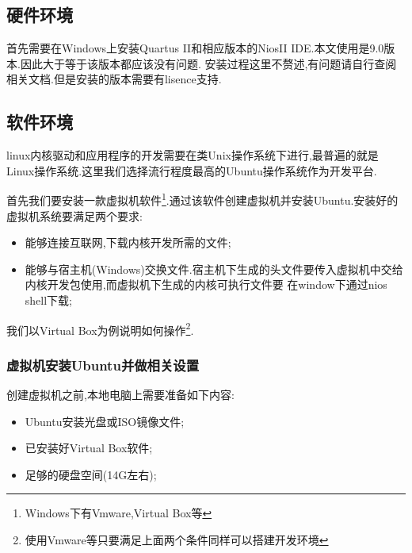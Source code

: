 \documentclass[12pt,a4paper,titlepage]{article}
\begin{document}
\subsection{硬件环境}
首先需要在Windows上安装Quartus II和相应版本的NiosII IDE.本文使用是9.0版本.因此大于等于该版本都应该没有问题.
安装过程这里不赘述,有问题请自行查阅相关文档.但是安装的版本{需要有lisence支持}.
\subsection{软件环境}
linux内核驱动和应用程序的开发需要在类Unix操作系统下进行,最普遍的就是Linux操作系统.这里我们选择流行程度最高的Ubuntu操作系统作为开发平台.

首先我们要安装一款虚拟机软件\footnote{Windows下有Vmware,Virtual Box等}.通过该软件创建虚拟机并安装Ubuntu.安装好的虚拟机系统要满足两个要求:
\begin{itemize}
\item 能够连接互联网,下载内核开发所需的文件;
\item 能够与宿主机(Windows)交换文件.宿主机下生成的头文件要传入虚拟机中交给内核开发包使用,而虚拟机下生成的内核可执行文件要
在window下通过nios shell下载;
\end{itemize}

我们以Virtual Box为例说明如何操作\footnote{使用Vmware等只要满足上面两个条件同样可以搭建开发环境}.
\subsubsection{虚拟机安装Ubuntu并做相关设置}
创建虚拟机之前,本地电脑上需要准备如下内容:
\begin{itemize}
\item Ubuntu安装光盘或ISO镜像文件;
\item 已安装好Virtual Box软件;
\item 足够的硬盘空间(14G左右);
\end{itemize}
\end{document}

